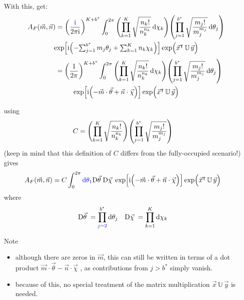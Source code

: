 \documentclass[
	english,
	a4paper,
	fontsize=10pt,
	parskip=half,
	titlepage=true,
	DIV=12,
	final
]{scrreprt}
\newcommand*{\transp}{\ensuremath{^\intercal}}
\newcommand*{\iunit}{\ensuremath{\mathrm{i}}}
\newcommand*{\DD}[1]{\ensuremath{\text{D}\vec{#1}\;}}
\begin{document}
With this, get:
\begin{multline}
	A_F(\vec{m}, \vec{n})
=
	\qty(
		\frac{{\color{blue}\iunit}}{2\pi\iunit}
	)^{K + b^*}
	\int_{0}^{2\pi}
		\qty( \prod_{k=1}^{K}
			\sqrt{\frac
				{ n_k! }
				{ n_k^{n_k} }
			}\dd{\chi_k}
		)
		\qty( \prod_{j=1}^{b^*}
			\sqrt{\frac
				{ m_j! }
				{ m_j^{m_j} }
			}\dd{\theta_j}
		)
\\
			\exp[
				\iunit \qty(
				-{\textstyle \sum_{j=1}^{b^*} m_j \theta_j}
				+{\textstyle \sum_{k=1}^{K}   n_k \chi  _k}
			)]
			\exp( \Big. \vec{x}\transp \, \mathbb{U} \, \vec{y})
\end{multline}
\begin{multline}
	\qquad\qquad
=
	\qty(
		\frac{1}{2\pi}
	)^{K + b^*}
	\int_{0}^{2\pi}
		\qty( \prod_{k=1}^{K}
			\sqrt{\frac
				{ n_k! }
				{ n_k^{n_k} }
			} \dd{\chi_k}
		)
		\qty( \prod_{j=1}^{b^*}
			\sqrt{\frac
				{ m_j! }
				{ m_j^{m_j} }
			} \dd{\theta_j}
		)
\\
		\exp[
			\iunit \qty(
			-\vec{m} \cdot \vec{\theta}
			+\vec{n} \cdot \vec{\chi}
		)]
		\exp( \Big. \vec{x}\transp \, \mathbb{U} \, \vec{y})
\end{multline}

using
\begin{align}
	C
&=
	\qty( \prod_{k=1}^{K}
		\sqrt{\frac
			{ n_k! }
			{ n_k^{n_k} }
		}
	)
	\qty( \prod_{j=1}^{b^*}
		\sqrt{\frac
			{ m_j! }
			{ m_j^{m_j} }
		}
	)
\label{eqn:DefC_m}
\end{align}
({\color{red}keep in mind that this definition of $C$ differs from the fully-occupied scenario!})
gives
\begin{align}
	A_F(\vec{m}, \vec{n})
&=
	C
	\int_{0}^{2\pi}
		{\color{blue} \dd{\theta_1}}
		\DD{\theta}
		\DD{\chi  }
			\exp[
				\iunit \qty(
				-\vec{m} \cdot \vec{\theta}
				+\vec{n} \cdot \vec{\chi}
			)]
			\exp( \Big. \vec{x}\transp \, \mathbb{U} \, \vec{y})
	\label{eqn:BSA_Int_BZO_Polar_m}
\end{align}
where
\begin{align}
	\DD{\theta}
&=
	\prod_{{\color{blue} j=2}}^{b^*} \dd{\theta_j}
&
	\DD{\chi}
&=
	\prod_{k=1}^{K}   \dd{\chi  _k}
\end{align}

Note
\begin{itemize}
\item although there are zeros in $\vec{m}$, this can still be written in terms of a dot product
	$\vec{m} \cdot \vec{\theta} - \vec{n} \cdot \vec{\chi}$
	, as contributions from $j > b^*$ simply vanish.
\item because of this, no special treatment of the matrix multiplication $\vec{x} \, \mathbb{U} \, \vec{y}$ is needed.
\end{itemize}
\end{document}
